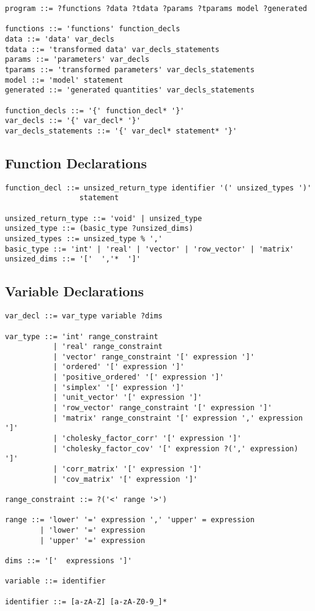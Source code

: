{\small
\begin{Verbatim}
program ::= ?functions ?data ?tdata ?params ?tparams model ?generated

functions ::= 'functions' function_decls
data ::= 'data' var_decls
tdata ::= 'transformed data' var_decls_statements
params ::= 'parameters' var_decls
tparams ::= 'transformed parameters' var_decls_statements
model ::= 'model' statement
generated ::= 'generated quantities' var_decls_statements

function_decls ::= '{' function_decl* '}'
var_decls ::= '{' var_decl* '}'
var_decls_statements ::= '{' var_decl* statement* '}'
\end{Verbatim}
}

\subsection{Function Declarations}

{
\small
\begin{Verbatim}[fontsize=\small]
function_decl ::= unsized_return_type identifier '(' unsized_types ')'
                 statement

unsized_return_type ::= 'void' | unsized_type
unsized_type ::= (basic_type ?unsized_dims)
unsized_types ::= unsized_type % ','
basic_type ::= 'int' | 'real' | 'vector' | 'row_vector' | 'matrix'
unsized_dims ::= '['  ','*  ']'
\end{Verbatim}
}

\subsection{Variable Declarations}

{
\small
\begin{Verbatim}[fontsize=\small]
var_decl ::= var_type variable ?dims

var_type ::= 'int' range_constraint
           | 'real' range_constraint
           | 'vector' range_constraint '[' expression ']'
           | 'ordered' '[' expression ']'
           | 'positive_ordered' '[' expression ']'
           | 'simplex' '[' expression ']'
           | 'unit_vector' '[' expression ']'
           | 'row_vector' range_constraint '[' expression ']'
           | 'matrix' range_constraint '[' expression ',' expression ']'
           | 'cholesky_factor_corr' '[' expression ']'
           | 'cholesky_factor_cov' '[' expression ?(',' expression) ']'
           | 'corr_matrix' '[' expression ']'
           | 'cov_matrix' '[' expression ']'

range_constraint ::= ?('<' range '>')

range ::= 'lower' '=' expression ',' 'upper' = expression
        | 'lower' '=' expression
        | 'upper' '=' expression

dims ::= '['  expressions ']'

variable ::= identifier

identifier ::= [a-zA-Z] [a-zA-Z0-9_]*
\end{Verbatim}
}

